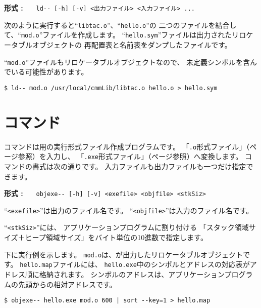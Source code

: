 \begin{flushleft}
{\bf 形式 : }~~~\verb/ld-- [-h] [-v] <出力ファイル> <入力ファイル> .../
\end{flushleft}

次のように実行すると``\verb/libtac.o/''、``\verb/hello.o/''の
二つのファイルを結合して、``\verb/mod.o/''ファイルを作成します。
``\verb/hello.sym/''ファイルは出力されたリロケータブルオブジェクトの
再配置表と名前表をダンプしたファイルです。

``\verb/mod.o/''ファイルもリロケータブルオブジェクトなので、
未定義シンボルを含んでいる可能性があります。

\begin{mylist}
\begin{verbatim}
$ ld-- mod.o /usr/local/cmmLib/libtac.o hello.o > hello.sym
\end{verbatim}
\end{mylist}

\section{{\objexe}コマンド}

{\objexe}コマンドは{\tacos}用の実行形式ファイル作成プログラムです。
「\verb/.o/形式ファイル」（\pageref{app:oformat}ページ参照）を入力し、
「\verb/.exe/形式ファイル」（\pageref{app:eformat}ページ参照）へ変換します。
{\objexe}コマンドの書式は次の通りです。
入力ファイルも出力ファイルも一つだけ指定できます。

\begin{flushleft}
{\bf 形式 : }~~~\verb/objexe-- [-h] [-v] <exefile> <objfile> <stkSiz>/
\end{flushleft}

``\verb/<exefile>/''は出力のファイル名です。
``\verb/<objfile>/''は入力のファイル名です。

``\verb/<stkSiz>/''には、
アプリケーションプログラムに割り付ける
「スタック領域サイズ＋ヒープ領域サイズ」をバイト単位の10進数で指定します。

下に実行例を示します。
\verb/mod.o/は、\ld が出力したリロケータブルオブジェクトです。
\verb/hello.map/ファイルには、
\verb/hello.exe/中のシンボルとアドレスの対応表がアドレス順に格納されます。
シンボルのアドレスは、アプリケーションプログラムの先頭からの相対アドレスです。

\begin{mylist}
\begin{verbatim}
$ objexe-- hello.exe mod.o 600 | sort --key=1 > hello.map
\end{verbatim}
\end{mylist}

